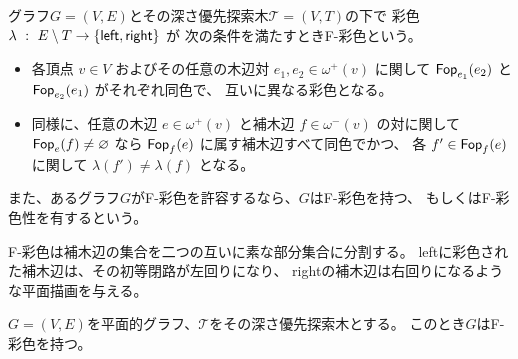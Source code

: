 \begin{definition}[F-彩色]
グラフ$G = (V, E)$とその深さ優先探索木$\mathcal{T} = (V, T)$の下で
彩色 $\lambda ~:~ E \setminus T \rightarrow \{{\sf left, right}\}$ が
次の条件を満たすときF-彩色という。
\begin{itemize}
\item 各頂点 $v \in V$ およびその任意の木辺対 $e_1, e_2 \in \omega^+(v)$ に関して
    $\operatorname{{\sf Fop}}_{e_1}(e_2)$ と $\operatorname{{\sf Fop}}_{e_2}(e_1)$ がそれぞれ同色で、
    互いに異なる彩色となる。
\item 同様に、任意の木辺 $e \in \omega^+(v)$ と補木辺 $f \in \omega^-(v)$ の対に関して
    $\operatorname{{\sf Fop}}_e(f) \neq \varnothing$ なら 
    $\operatorname{{\sf Fop}}_{f}(e)$ に属す補木辺すべて同色でかつ、
    各 $f' \in \operatorname{{\sf Fop}}_f(e)$ に関して $\lambda(f') \neq \lambda(f)$ となる。
\end{itemize}
また、あるグラフ$G$が{\sf F}-彩色を許容するなら、$G$はF-彩色を持つ、
もしくはF-彩色性を有するという。
\end{definition}

F-彩色は補木辺の集合を二つの互いに素な部分集合に分割する。
{\sf left}に彩色された補木辺は、その初等閉路が左回りになり、
{\sf right}の補木辺は右回りになるような平面描画を与える。



\begin{theorem}[F-彩色定理]
$G=(V, E)$を平面的グラフ、${\mathcal T}$をその深さ優先探索木とする。
このとき$G$はF-彩色を持つ。
\end{theorem}


